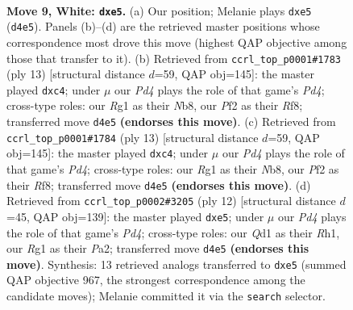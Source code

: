 \documentclass[11pt]{article}
\begin{document}
\clearpage

\begin{figure}[p]\centering
\begin{subfigure}{0.46\textwidth}\centering
\resizebox{\linewidth}{!}{%
\newchessgame
\chessboard[
  setfen={r1bqk2r/ppp1ppbp/1nn3p1/4p3/3P4/1B3N2/PPP1KPPP/RNBQ2R1 w kq - 0 9},
  showmover=false,
  pgfstyle=straightmove, color=movearrow, markmove={d4-e5}
]}
\caption{}
\end{subfigure}\hfill
\begin{subfigure}{0.46\textwidth}\centering
\resizebox{\linewidth}{!}{%
\newchessgame
\chessboard[
  setfen={rnbq1rk1/pp2ppbp/5np1/2Pp4/2P5/2N2NP1/PP2PPBP/R1BQK2R b KQ - 0 7},
  showmover=false,
  pgfstyle=straightmove, color=movearrow, markmove={d5-c4}
]}
\caption{}
\end{subfigure}
\\[4pt]
\begin{subfigure}{0.46\textwidth}\centering
\resizebox{\linewidth}{!}{%
\newchessgame
\chessboard[
  setfen={rnbq1rk1/pp2ppbp/5np1/2Pp4/2P5/2N2NP1/PP2PPBP/R1BQK2R b KQ - 0 7},
  showmover=false,
  pgfstyle=straightmove, color=movearrow, markmove={d5-c4}
]}
\caption{}
\end{subfigure}\hfill
\begin{subfigure}{0.46\textwidth}\centering
\resizebox{\linewidth}{!}{%
\newchessgame
\chessboard[
  setfen={r1bqk2r/ppp1ppbp/2n2np1/4p3/2BP4/5N2/PPP1QPPP/RNB1K2R w KQkq - 0 7},
  showmover=false,
  pgfstyle=straightmove, color=movearrow, markmove={d4-e5}
]}
\caption{}
\end{subfigure}
\caption{\textbf{Move 9, White: \texttt{dxe5}.} (a) Our position; Melanie plays \texttt{dxe5} (\texttt{d4e5}). Panels (b)--(d) are the retrieved master positions whose correspondence most drove this move (highest QAP objective among those that transfer to it). (b) Retrieved from \texttt{ccrl\_top\_p0001\#1783} (ply 13) [structural distance $d$=59, QAP obj=145]: the master played \texttt{dxc4}; under $\mu$ our \emph{Pd4} plays the role of that game's \emph{Pd4}; cross-type roles: our \emph{R}g1 as their \emph{N}b8, our \emph{P}f2 as their \emph{R}f8; transferred move \texttt{d4e5} \textbf{(endorses this move)}. (c) Retrieved from \texttt{ccrl\_top\_p0001\#1784} (ply 13) [structural distance $d$=59, QAP obj=145]: the master played \texttt{dxc4}; under $\mu$ our \emph{Pd4} plays the role of that game's \emph{Pd4}; cross-type roles: our \emph{R}g1 as their \emph{N}b8, our \emph{P}f2 as their \emph{R}f8; transferred move \texttt{d4e5} \textbf{(endorses this move)}. (d) Retrieved from \texttt{ccrl\_top\_p0002\#3205} (ply 12) [structural distance $d$=45, QAP obj=139]: the master played \texttt{dxe5}; under $\mu$ our \emph{Pd4} plays the role of that game's \emph{Pd4}; cross-type roles: our \emph{Q}d1 as their \emph{R}h1, our \emph{R}g1 as their \emph{P}a2; transferred move \texttt{d4e5} \textbf{(endorses this move)}. Synthesis: 13 retrieved analogs transferred to \texttt{dxe5} (summed QAP objective 967, the strongest correspondence among the candidate moves); Melanie committed it via the \texttt{search} selector.}
\label{fig:thought-m16}
\end{figure}
\end{document}
